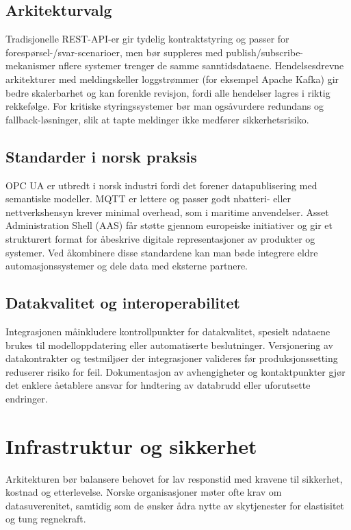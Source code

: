 \subsection{Arkitekturvalg}
Tradisjonelle REST-API-er gir tydelig kontraktstyring og passer for foresp\o rsel-/svar-scenarioer, men b\o r suppleres med publish/subscribe-mekanismer n\aar flere systemer trenger de samme sanntidsdataene. Hendelsesdrevne arkitekturer med meldingsk\oer eller loggstr\o mmer (for eksempel Apache Kafka) gir bedre skalerbarhet og kan forenkle revisjon, fordi alle hendelser lagres i riktig rekkef\o lge. For kritiske styringssystemer b\o r man ogs\aa vurdere redundans og fallback-l\o sninger, slik at tapte meldinger ikke medf\o rer sikkerhetsrisiko.

\subsection{Standarder i norsk praksis}
OPC UA er utbredt i norsk industri fordi det forener datapublisering med semantiske modeller. MQTT er lettere og passer godt n\aar batteri- eller nettverkshensyn krever minimal overhead, som i maritime anvendelser. Asset Administration Shell (AAS) f\aa r st\o tte gjennom europeiske initiativer og gir et strukturert format for \aa beskrive digitale representasjoner av produkter og systemer. Ved \aa kombinere disse standardene kan man b\o de integrere eldre automasjonssystemer og dele data med eksterne partnere.

\subsection{Datakvalitet og interoperabilitet}
Integrasjonen m\aa inkludere kontrollpunkter for datakvalitet, spesielt n\aar dataene brukes til modelloppdatering eller automatiserte beslutninger. Versjonering av datakontrakter og testmilj\o er der integrasjoner valideres f\o r produksjonssetting reduserer risiko for feil. Dokumentasjon av avhengigheter og kontaktpunkter gj\o r det enklere \aa etablere ansvar for h\a ndtering av databrudd eller uforutsette endringer.

\section{Infrastruktur og sikkerhet}
Arkitekturen b\o r balansere behovet for lav responstid med kravene til sikkerhet, kostnad og etterlevelse. Norske organisasjoner m\o ter ofte krav om datasuverenitet, samtidig som de \o nsker \aa dra nytte av skytjenester for elastisitet og tung regnekraft.

